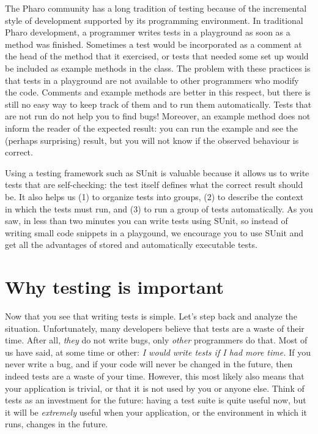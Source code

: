 \documentclass[10pt,twoside,english]{_support/latex/sbabook/sbabook}
\begin{document}
 The Pharo community has a long tradition of testing because of the incremental style of
development supported by its programming environment. In traditional Pharo
development, a programmer writes tests in a playground as soon as a method
was finished. Sometimes a test would be incorporated as a comment at the head of
the method that it exercised, or tests that needed some set up would be included
as example methods in the class. The problem with these practices is that tests
in a playground are not available to other programmers who modify the code.
Comments and example methods are better in this respect, but there is still no
easy way to keep track of them and to run them automatically. Tests that are not
run do not help you to find bugs! Moreover, an example method does not inform
the reader of the expected result: you can run the example and see the (perhaps
surprising) result, but you will not know if the observed behaviour is correct.

Using a testing framework such as SUnit  is valuable because it allows us to write tests that are self-checking:
the test itself defines what the correct result should be. It also helps us (1) to
organize tests into groups, (2) to describe the context in which the tests must run,
and (3) to run a group of tests automatically. As you saw, in less than two minutes you can
write tests using SUnit, so instead of writing small code snippets in a
playgound, we encourage you to use SUnit and get all the advantages of stored
and automatically executable tests.
\section{Why testing is important}\label{sec:whytest}
Now that you see that writing tests is simple. Let's step back and analyze the situation.
Unfortunately, many developers believe that tests are a waste of their time.
After all, \textit{they} do not write bugs, only \textit{other} programmers do that. Most
of us have said, at some time or other: \textit{I would write tests if I had more
time.} If you never write a bug, and if your code will never be changed in the
future, then indeed tests are a waste of your time. However, this most likely
also means that your application is trivial, or that it is not used by you or
anyone else. Think of tests as an investment for the future: having a test suite 
is quite useful now, but it will be \textit{extremely} useful when your
application, or the environment in which it runs, changes in the future.
\end{document}
